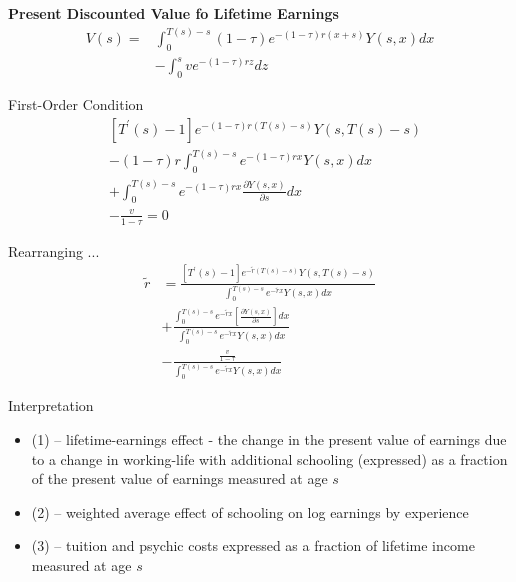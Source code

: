\begin{frame}
\textbf{Present Discounted Value fo Lifetime Earnings}
\begin{align*}
V(s) = & \int_0^{T(s) - s} (1 - \tau) e^{-(1 - \tau)r(x + s)} Y(s,x) dx \\
       & - \int^s_0 ve^{-(1 - \tau)rz}dz
\end{align*}
\end{frame}


\begin{frame}
First-Order Condition
\begin{align*}
& [T^\prime(s) - 1]e^{-(1 - \tau)r(T(s) - s)} Y(s, T(s) - s) \\
& - (1 - \tau)r\int^{T(s) - s}_0 e^{-(1 - \tau)rx} Y(s, x)dx \\
& + \int_0^{T(s) - s} e^{-(1 - \tau) rx} \frac{\partial Y(s, x)}{\partial s}dx \\
& - \frac{v}{ 1  -\tau} = 0
\end{align*}
\end{frame}


\begin{frame}
Rearranging ...
\begin{align}
\tilde{r} & = \frac{[T^\prime(s) - 1]e^{-\tilde{r}(T(s) - s)}Y(s, T(s) - s )}{\int_0^{T(s) - s} e^{-\tilde{r}x}Y(s, x) dx} \\
          & + \frac{\int_0^{T(s) - s}e^{-\tilde{r}x}\left[\frac{\partial Y(s, x)}{\partial s}\right] dx}{\int_0^{T(s) - s}e^{-\tilde{r}x}Y(s, x) dx} \\
          & - \frac{\frac{v}{1-\tau}}{\int_0^{T(s) - s}e^{-\tilde{r}x}Y(s, x)dx}
\end{align}
\end{frame}

\begin{frame}
Interpretation
\begin{itemize}
\item (1) -- lifetime-earnings effect - the change in the present value of earnings due to a change in working-life with additional schooling (expressed) as a fraction of the present value of earnings measured at age $s$
\item (2) -- weighted average effect of schooling on log earnings by experience
\item (3) -- tuition and psychic costs expressed as a fraction of lifetime income measured at age $s$
\end{itemize}
\end{frame}


